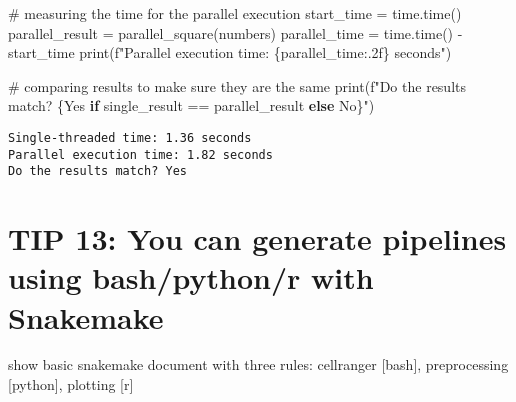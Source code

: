 \documentclass[
  letterpaper,
  DIV=11,
  numbers=noendperiod]{scrartcl}
\newenvironment{Shaded}{\begin{snugshade}}{\end{snugshade}}
\newcommand{\BuiltInTok}[1]{\textcolor[rgb]{0.00,0.23,0.31}{#1}}
\newcommand{\CommentTok}[1]{\textcolor[rgb]{0.37,0.37,0.37}{#1}}
\newcommand{\ControlFlowTok}[1]{\textcolor[rgb]{0.00,0.23,0.31}{\textbf{#1}}}
\newcommand{\NormalTok}[1]{\textcolor[rgb]{0.00,0.23,0.31}{#1}}
\newcommand{\OperatorTok}[1]{\textcolor[rgb]{0.37,0.37,0.37}{#1}}
\newcommand{\SpecialCharTok}[1]{\textcolor[rgb]{0.37,0.37,0.37}{#1}}
\newcommand{\SpecialStringTok}[1]{\textcolor[rgb]{0.13,0.47,0.30}{#1}}
\newcommand{\StringTok}[1]{\textcolor[rgb]{0.13,0.47,0.30}{#1}}
\begin{document}
\begin{Shaded}
\begin{Highlighting}[]
    \CommentTok{\# measuring the time for the parallel execution}
\NormalTok{    start\_time }\OperatorTok{=}\NormalTok{ time.time()}
\NormalTok{    parallel\_result }\OperatorTok{=}\NormalTok{ parallel\_square(numbers)}
\NormalTok{    parallel\_time }\OperatorTok{=}\NormalTok{ time.time() }\OperatorTok{{-}}\NormalTok{ start\_time}
    \BuiltInTok{print}\NormalTok{(}\SpecialStringTok{f"Parallel execution time: }\SpecialCharTok{\{}\NormalTok{parallel\_time}\SpecialCharTok{:.2f\}}\SpecialStringTok{ seconds"}\NormalTok{)}
    
    \CommentTok{\# comparing results to make sure they are the same}
    \BuiltInTok{print}\NormalTok{(}\SpecialStringTok{f"Do the results match? }\SpecialCharTok{\{}\StringTok{\textquotesingle{}Yes\textquotesingle{}} \ControlFlowTok{if}\NormalTok{ single\_result }\OperatorTok{==}\NormalTok{ parallel\_result }\ControlFlowTok{else} \StringTok{\textquotesingle{}No\textquotesingle{}}\SpecialCharTok{\}}\SpecialStringTok{"}\NormalTok{)}
\end{Highlighting}
\end{Shaded}

\begin{verbatim}
Single-threaded time: 1.36 seconds
Parallel execution time: 1.82 seconds
Do the results match? Yes
\end{verbatim}

\section{TIP 13: You can generate pipelines using bash/python/r with
Snakemake}\label{tip-13-you-can-generate-pipelines-using-bashpythonr-with-snakemake}

show basic snakemake document with three rules: cellranger {[}bash{]},
preprocessing {[}python{]}, plotting {[}r{]}
\end{document}
